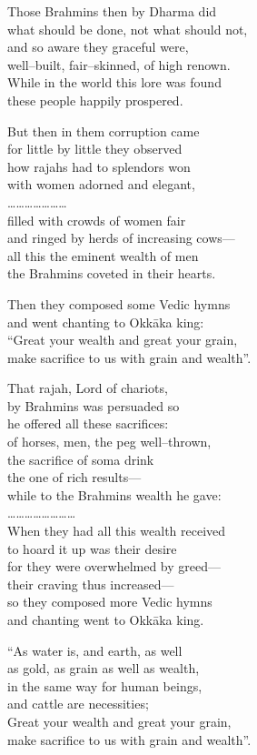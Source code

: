Those Brahmins then by Dharma did\\ what should be done, not what should not,\\ and so aware they graceful were,\\ well–built, fair–skinned, of high renown.\\ While in the world this lore was found\\ these people happily prospered.

But then in them corruption came\\ for little by little they observed\\ how rajahs had to splendors won\\ with women adorned and elegant,\\ …………………\\ filled with crowds of women fair\\ and ringed by herds of increasing cows—\\ all this the eminent wealth of men\\ the Brahmins coveted in their hearts.

Then they composed some Vedic hymns\\ and went chanting to Okkāka king:\\ “Great your wealth and great your grain,\\ make sacrifice to us with grain and wealth”.

That rajah, Lord of chariots,\\ by Brahmins was persuaded so\\ he offered all these sacrifices:\\ of horses, men, the peg well–thrown,\\ the sacrifice of soma drink\\ the one of rich results—\\ while to the Brahmins wealth he gave:\\ ……………………\\ When they had all this wealth received\\ to hoard it up was their desire\\ for they were overwhelmed by greed—\\ their craving thus increased—\\ so they composed more Vedic hymns\\ and chanting went to Okkāka king.

“As water is, and earth, as well\\ as gold, as grain as well as wealth,\\ in the same way for human beings,\\ and cattle are necessities;\\ Great your wealth and great your grain,\\ make sacrifice to us with grain and wealth”.

